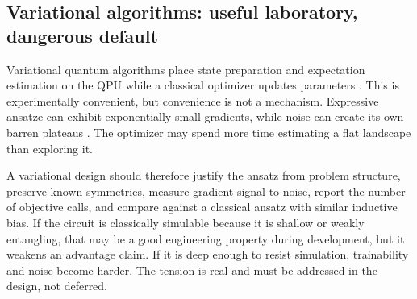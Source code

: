 \subsection{Variational algorithms: useful laboratory, dangerous default}

Variational quantum algorithms place state preparation and expectation estimation on the QPU while a classical optimizer updates parameters \citep{peruzzo2014,cerezo2021}. This is experimentally convenient, but convenience is not a mechanism. Expressive ansatze can exhibit exponentially small gradients, while noise can create its own barren plateaus \citep{mcclean2018,wang2021}. The optimizer may spend more time estimating a flat landscape than exploring it.

A variational design should therefore justify the ansatz from problem structure, preserve known symmetries, measure gradient signal-to-noise, report the number of objective calls, and compare against a classical ansatz with similar inductive bias. If the circuit is classically simulable because it is shallow or weakly entangling, that may be a good engineering property during development, but it weakens an advantage claim. If it is deep enough to resist simulation, trainability and noise become harder. The tension is real and must be addressed in the design, not deferred.
